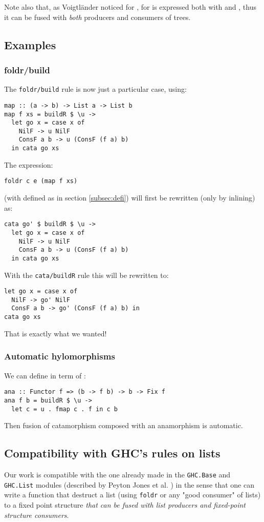 Note also that, as Voigtländer \cite{Voigtlnder2008TypesFP} noticed for ,  for  is expressed both with  and , thus it can be fused with \emph{both} producers and consumers of trees.

\subsection{Examples}
\subsubsection{foldr/build}
The \verb|foldr/build| rule is now just a particular case, using:
\begin{verbatim}
map :: (a -> b) -> List a -> List b
map f xs = buildR $ \u ->
  let go x = case x of
    NilF -> u NilF
    ConsF a b -> u (ConsF (f a) b)
  in cata go xs
\end{verbatim}

\noindent The expression:
\begin{verbatim}
foldr c e (map f xs)
\end{verbatim}
(with  defined as in section \ref{subsec:defi}) will first be rewritten (only by inlining) as:
\begin{verbatim}
cata go' $ buildR $ \u ->
  let go x = case x of
    NilF -> u NilF
    ConsF a b -> u (ConsF (f a) b)
  in cata go xs
\end{verbatim}

\noindent With the \verb|cata/buildR| rule this will be rewritten to:
\begin{verbatim}
let go x = case x of
  NilF -> go' NilF
  ConsF a b -> go' (ConsF (f a) b) in
cata go xs
\end{verbatim}
That is exactly what we wanted!

\subsubsection{Automatic hylomorphisms}
We can define  in term of :
\begin{verbatim}
ana :: Functor f => (b -> f b) -> b -> Fix f
ana f b = buildR $ \u ->
  let c = u . fmap c . f in c b
\end{verbatim}

\noindent Then fusion of catamorphism composed with an anamorphism is automatic.

\subsection{Compatibility with GHC's rules on lists}
Our work is compatible with the one already made in the \verb|GHC.Base| and \verb|GHC.List| modules (described by Peyton Jones et al. \cite{pbr} ) in the sense that one can write a function that destruct a list (using \verb|foldr| or any "good consumer" of lists) to a fixed point structure \emph{that can be fused with list producers and fixed-point structure consumers}.

